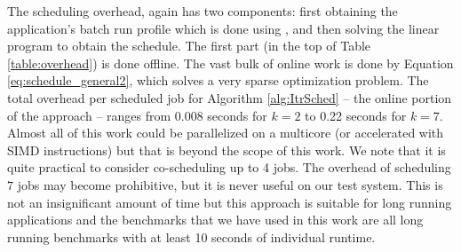 The scheduling overhead, again has two components: first obtaining the
application's batch run profile which is done using \SYSTEM{}, and
then solving the linear program to obtain the schedule. The first part
(in the top of Table \ref{table:overhead}) is done offline.  The vast
bulk of online work is done by Equation \eqref{eq:schedule_general2},
which solves a very sparse optimization problem. The total overhead
per scheduled job for Algorithm \ref{alg:ItrSched} -- the online
portion of the approach -- ranges from 0.008 seconds for $k=2$ to 0.22
seconds for $k=7$. Almost all of this work could be parallelized on a
multicore (or accelerated with SIMD instructions) but that is beyond
the scope of this work.  We note that it is quite practical to
consider co-scheduling up to 4 jobs.  The overhead of scheduling $7$
jobs may become prohibitive, but it is never useful on our test
system.  This is not an insignificant amount of time but this approach
is suitable for long running applications and the benchmarks that we
have used in this work are all long running benchmarks with at least
10 seconds of individual runtime.
